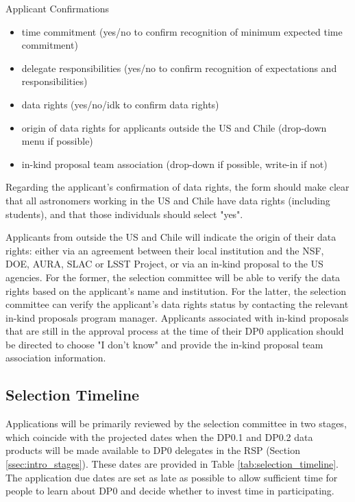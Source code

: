 \documentclass[DM,lsstdraft,authoryear,toc]{lsstdoc}
\begin{document}
Applicant Confirmations
\begin{itemize}
\item time commitment (yes/no to confirm recognition of minimum expected time commitment)
\item delegate responsibilities (yes/no to confirm recognition of expectations and responsibilities)
\item data rights (yes/no/idk to confirm data rights)
\item origin of data rights for applicants outside the US and Chile (drop-down menu if possible)
\item in-kind proposal team association (drop-down if possible, write-in if not)
\end{itemize}

Regarding the applicant's confirmation of data rights, the form should make clear that all astronomers working in the US and Chile have data rights (including students), and that those individuals should select "yes".

Applicants from outside the US and Chile will indicate the origin of their data rights: either via an agreement between their local institution and the NSF, DOE, AURA, SLAC or LSST Project, or via an in-kind proposal to the US agencies. 
For the former, the selection committee will be able to verify the data rights based on the applicant's name and institution.
For the latter, the selection committee can verify the applicant's data rights status by contacting the relevant in-kind proposals program manager.
Applicants associated with in-kind proposals that are still in the approval process at the time of their DP0 application should be directed to choose "I don't know" and provide the in-kind proposal team association information. 

\subsection{Selection Timeline}\label{ssec:sel_time}

Applications will be primarily reviewed by the selection committee in two stages, which coincide with the projected dates when the DP0.1 and DP0.2 data products will be made available to DP0 delegates in the RSP (Section \ref{ssec:intro_stages}).
These dates are provided in Table \ref{tab:selection_timeline}.
The application due dates are set as late as possible to allow sufficient time for people to learn about DP0 and decide whether to invest time in participating.
\end{document}
